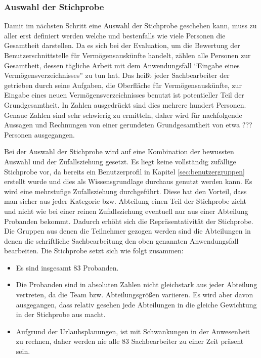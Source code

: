 
\subsubsection{Auswahl der Stichprobe}
Damit im nächsten Schritt eine Auswahl der Stichprobe geschehen kann, muss zu aller erst definiert werden welche und bestenfalls wie viele Personen die Gesamtheit darstellen. Da es sich bei der Evaluation, um die Bewertung der Benutzerschnittstelle für Vermögensauskünfte handelt, zählen alle Personen zur Gesamtheit, dessen tägliche Arbeit mit dem Anwendungsfall \enquote{Eingabe eines Vermögensverzeichnisses} zu tun hat. Das heißt jeder Sachbearbeiter der getrieben durch seine Aufgaben, die Oberfläche für Vermögensauskünfte, zur Eingabe eines neuen Vermögensverzeichnisses benutzt ist potentieller Teil der Grundgesamtheit. In Zahlen ausgedrückt sind dies mehrere hundert Personen. Genaue Zahlen sind sehr schwierig zu ermitteln, daher wird für nachfolgende Aussagen und Rechnungen von einer gerundeten Grundgesamtheit von etwa ??? Personen ausgegangen.

Bei der Auswahl der Stichprobe wird auf eine Kombination der bewussten Auswahl und der Zufallsziehung gesetzt. Es liegt keine vollständig zufällige Stichprobe vor, da bereits ein Benutzerprofil in Kapitel \ref{sec:benutzergruppen} erstellt wurde und dies als Wissensgrundlage durchaus genutzt werden kann. Es wird eine mehrstufige Zufallsziehung durchgeführt. Diese hat den Vorteil, dass man sicher aus jeder Kategorie bzw. Abteilung einen Teil der Stichprobe zieht und nicht wie bei einer reinen Zufallsziehung eventuell nur aus einer Abteilung Probanden bekommt. Dadurch erhöht sich die Repräsentativität der Stichprobe. Die Gruppen aus denen die Teilnehmer gezogen werden sind die Abteilungen in denen die schriftliche Sachbearbeitung den oben genannten Anwendungsfall bearbeiten. Die Stichprobe setzt sich wie folgt zusammen:
\begin{itemize}
    \item Es sind insgesamt 83 Probanden.
    \item Die Probanden sind in absoluten Zahlen nicht gleichstark aus jeder Abteilung vertreten, da die Team bzw. Abteilungsgrößen variieren. Es wird aber davon ausgegangen, dass relativ gesehen jede Abteilungen in die gleiche Gewichtung in der Stichprobe aus macht.
    \item Aufgrund der Urlaubsplanungen, ist mit Schwankungen in der Anwesenheit zu rechnen, daher werden nie alle 83 Sachbearbeiter zu einer Zeit präsent sein.
\end{itemize}

